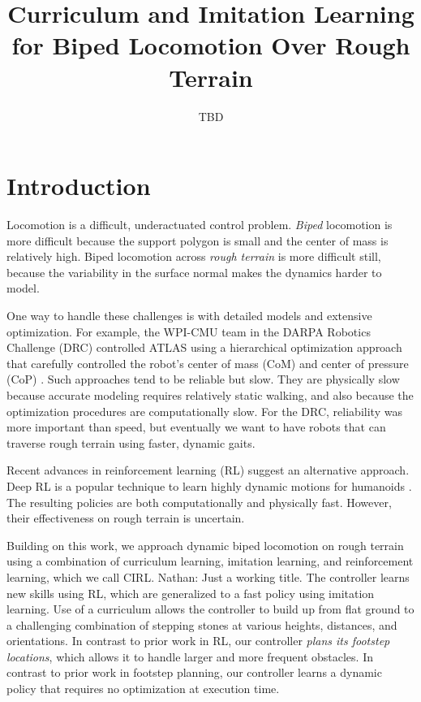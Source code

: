 \documentclass[a4paper]{article}
\title{Curriculum and Imitation Learning for Biped Locomotion Over Rough Terrain}
\author{TBD}
\newcommand{\nhatch}[1]{{\leavevmode\color{blue} Nathan: #1}}
\begin{document}
\maketitle

\section{Introduction}

Locomotion is a difficult, underactuated control problem.
\emph{Biped} locomotion is more difficult because the support polygon is small and the center of mass is relatively high.
Biped locomotion across \emph{rough terrain} is more difficult still, because the variability in the surface normal makes the dynamics harder to model.

One way to handle these challenges is with detailed models and extensive optimization.
For example, the WPI-CMU team in the DARPA Robotics Challenge (DRC) controlled ATLAS using a hierarchical optimization approach that carefully controlled the robot's center of mass (CoM) and center of pressure (CoP) \citep{feng2015optimization}.
Such approaches tend to be reliable but slow.
They are physically slow because accurate modeling requires relatively static walking, and also because the optimization procedures are computationally slow.
For the DRC, reliability was more important than speed, but eventually we want to have robots that can traverse rough terrain using faster, dynamic gaits.

Recent advances in reinforcement learning (RL) suggest an alternative approach.
Deep RL is a popular technique to learn highly dynamic motions for humanoids \citep{peng2018deepmimic, heess2017emergence}.
The resulting policies are both computationally and physically fast.
However, their effectiveness on rough terrain is uncertain.

Building on this work, we approach dynamic biped locomotion on rough terrain using a combination of curriculum learning, imitation learning, and reinforcement learning, which we call CIRL. \nhatch{Just a working title.}
The controller learns new skills using RL, which are generalized to a fast policy using imitation learning.
Use of a curriculum allows the controller to build up from flat ground to a challenging combination of stepping stones at various heights, distances, and orientations.
In contrast to prior work in RL, our controller \emph{plans its footstep locations}, which allows it to handle larger and more frequent obstacles.
In contrast to prior work in footstep planning, our controller learns a dynamic policy that requires no optimization at execution time.
\end{document}
